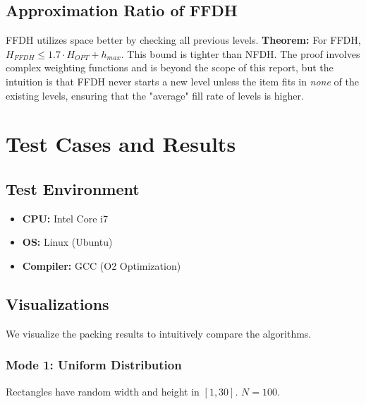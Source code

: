 \documentclass[a4paper,12pt]{article}
\begin{document}
\subsection{Approximation Ratio of FFDH}
FFDH utilizes space better by checking all previous levels.
\textbf{Theorem:} For FFDH, $H_{FFDH} \le 1.7 \cdot H_{OPT} + h_{max}$.
This bound is tighter than NFDH. The proof involves complex weighting functions and is beyond the scope of this report, but the intuition is that FFDH never starts a new level unless the item fits in \textit{none} of the existing levels, ensuring that the "average" fill rate of levels is higher.

\section{Test Cases and Results}

\subsection{Test Environment}
\begin{itemize}
    \item \textbf{CPU:} Intel Core i7
    \item \textbf{OS:} Linux (Ubuntu)
    \item \textbf{Compiler:} GCC (O2 Optimization)
\end{itemize}

\subsection{Visualizations}
We visualize the packing results to intuitively compare the algorithms.

\subsubsection{Mode 1: Uniform Distribution}
Rectangles have random width and height in $[1, 30]$. $N=100$.
\end{document}
